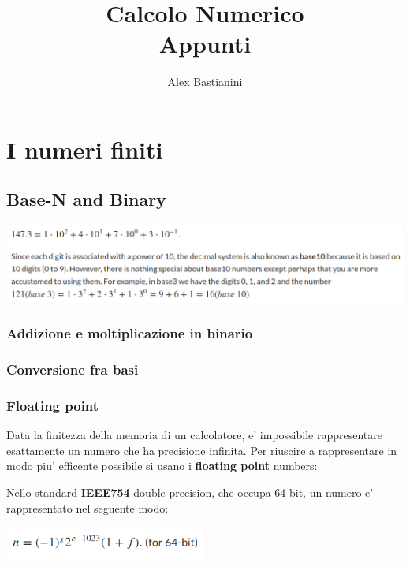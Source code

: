 \documentclass{report}
\title{\Huge{Calcolo Numerico}\\Appunti}
\author{\huge{Alex Bastianini}}
\date{}
\begin{document}
\maketitle
\newpage%
\tableofcontents
\pagebreak

\chapter{I numeri finiti}
\section{Base-N and Binary}
\begin{center}
  \includegraphics[width=1\textwidth]{img/2024-09-16-13-39-47.png}
\end{center}
\subsection{Addizione e moltiplicazione in binario}
\subsection{Conversione fra basi}
\subsection{Floating point}
Data la finitezza della memoria di un calcolatore, e' impossibile rappresentare esattamente un numero che ha precisione infinita. Per riuscire a rappresentare in modo piu' efficente possibile si usano i \textbf{floating point} numbers:

Nello standard \textbf{IEEE754} double precision, che occupa 64 bit, un numero e' rappresentato nel seguente modo:
\begin{center}
  \includegraphics[width=0.5\textwidth]{img/2024-09-16-14-02-10.png}
\end{center}
\end{document}
